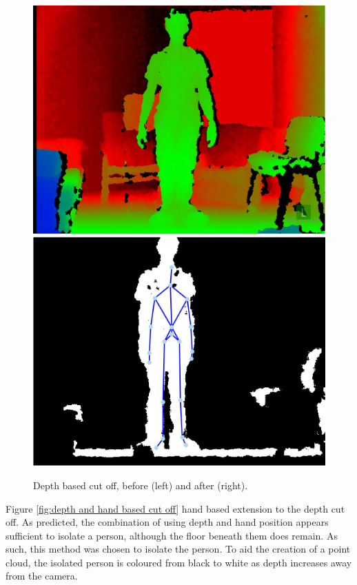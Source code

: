 \begin{figure}[h]
\begin{center}
\includegraphics[scale=0.4]{images/parse1} 
\includegraphics[scale=0.4]{images/parse2}
\end{center}
\caption{Depth based cut off, before (left) and after (right).}
\label{fig:depth based cut off}
\end{figure} 

Figure \ref{fig:depth and hand based cut off} hand based extension to the depth cut off. As predicted, the combination of using depth and hand position appears sufficient to isolate a person, although the floor beneath them does remain. As such, this method was chosen to isolate the person. To aid the creation of a point cloud, the isolated person is coloured from black to white as depth increases away from the camera.\\

